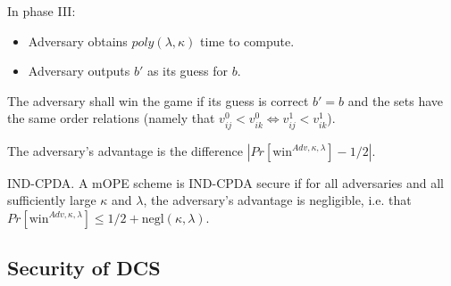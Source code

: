 \documentclass[12pt]{article}
\newenvironment{definition}[1][Definition]{\begin{trivlist}
\item[\hskip \labelsep {\bfseries #1}]}{\end{trivlist}}
\begin{document}
In phase III:
\begin{itemize}
  \item Adversary obtains $poly(\lambda, \kappa)$ time to compute.
  \item Adversary outputs $b'$ as its guess for $b$. 
\end{itemize}

The adversary shall win the game if its guess is correct $b' = b$ and the sets have the same order relations (namely that $v_{ij}^0 < v_{ik}^0 \Leftrightarrow v_{ij}^1 < v_{ik}^1$).

\begin{definition}
  The adversary's advantage is the difference $|Pr[\textrm{win}^{Adv, \kappa, \lambda}] - 1/2|$.
\end{definition}

\begin{definition}
  IND-CPDA. A mOPE scheme is IND-CPDA secure if for all adversaries and all sufficiently large $\kappa$ and $\lambda$, the adversary's advantage is negligible, i.e. that $Pr[\textrm{win}^{Adv, \kappa, \lambda}] \leq 1/2 + \textrm{negl}(\kappa, \lambda)$.
\end{definition}

\subsection{Security of DCS}
\end{document}
